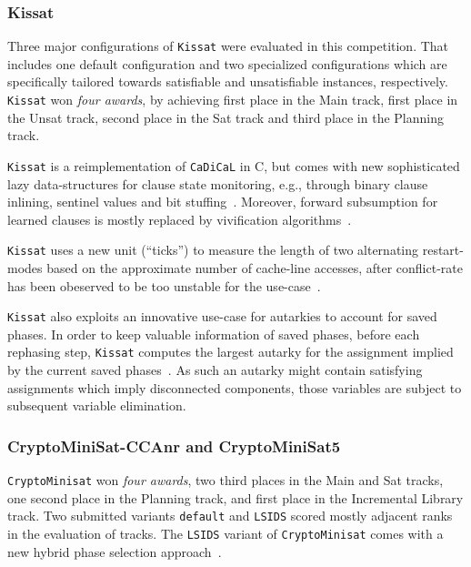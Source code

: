 \documentclass{elsarticle}
\newcommand{\solver}[1]{\texttt{#1}}
\begin{document}
\subsubsection{Kissat} 

Three major configurations of \solver{Kissat} were evaluated in this competition. 
That includes one default configuration and two specialized configurations which are specifically tailored towards satisfiable and unsatisfiable instances, respectively. 
\solver{Kissat} won \emph{four awards}, by achieving first place in the Main track, first place in the Unsat track, second place in the Sat track and third place in the Planning track. 

\solver{Kissat} is a reimplementation of \solver{CaDiCaL} in C,
but comes with new sophisticated lazy data-structures for clause state monitoring, e.g., through binary clause inlining, sentinel values and bit stuffing~\cite{Biere:SC2019,Biere:SC2020}. 
Moreover, forward subsumption for learned clauses is mostly replaced by vivification algorithms~\cite{ChuMinLi:2020:Vivification}. 

\solver{Kissat} uses a new unit (``ticks'') to measure the length of two alternating restart-modes based on the approximate number of cache-line accesses, after conflict-rate has been obeserved to be too unstable for the use-case~\cite{Biere:SC2020}. 

\solver{Kissat} also exploits an innovative use-case for autarkies to account for saved phases. 
In order to keep valuable information of saved phases, before each rephasing step, \solver{Kissat} computes the largest autarky for the assignment implied by the current saved phases~\cite{Kiesl:2019:Autarkies}. 
As such an autarky might contain satisfying assignments which imply disconnected components, those variables are subject to subsequent variable elimination. 


\subsubsection{CryptoMiniSat-CCAnr and CryptoMiniSat5}
\label{sec:cryptominisat}

\solver{CryptoMinisat} won \emph{four awards}, two third places in the Main and Sat tracks, one second place in the Planning track, and first place in the Incremental Library track. 
Two submitted variants \solver{default} and \solver{LSIDS} scored mostly adjacent ranks in the evaluation of tracks. 
The \solver{LSIDS} variant of \solver{CryptoMinisat} comes with a new hybrid phase selection approach~\cite{Shaw:2020:LSIDS,Soos:SC2020}.
\end{document}
